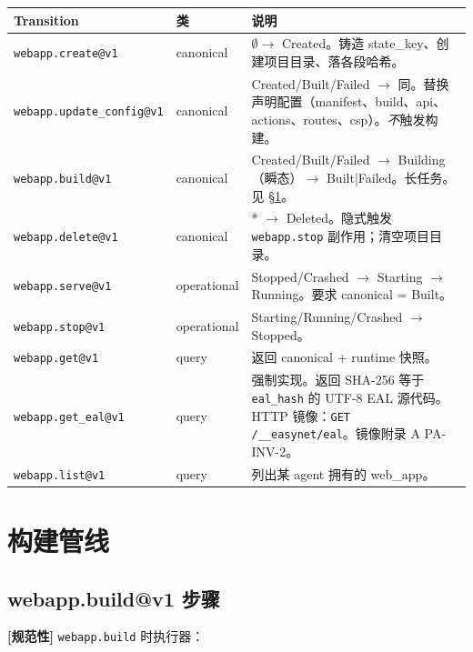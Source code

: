 \documentclass[11pt,a4paper]{article}
\newcommand{\normsv}{\textcolor{normativecolor}{\textbf{[规范性]}}\xspace}
\theoremstyle{definition}
\begin{document}
\begin{center}
\renewcommand{\arraystretch}{1.2}
\begin{tabularx}{\linewidth}{l l X}
\toprule
\textbf{Transition} & \textbf{类} & \textbf{说明} \\
\midrule
\texttt{webapp.create@v1}      & canonical   & $\emptyset \to$ Created。铸造 state\_key、创建项目目录、落各段哈希。 \\
\texttt{webapp.update\_config@v1}
                               & canonical   & Created/Built/Failed $\to$ 同。替换声明配置（manifest、build、api、actions、routes、csp）。\emph{不}触发构建。 \\
\texttt{webapp.build@v1}       & canonical   & Created/Built/Failed $\to$ Building（瞬态）$\to$ Built|Failed。长任务。见 \S\ref{sec:build-pipeline}。 \\
\texttt{webapp.delete@v1}      & canonical   & * $\to$ Deleted。隐式触发 \texttt{webapp.stop} 副作用；清空项目目录。 \\
\texttt{webapp.serve@v1}       & operational & Stopped/Crashed $\to$ Starting $\to$ Running。要求 canonical = Built。 \\
\texttt{webapp.stop@v1}        & operational & Starting/Running/Crashed $\to$ Stopped。 \\
\texttt{webapp.get@v1}         & query       & 返回 canonical + runtime 快照。 \\
\texttt{webapp.get\_eal@v1}    & query       & 强制实现。返回 SHA-256 等于 \texttt{eal\_hash} 的 UTF-8 EAL 源代码。HTTP 镜像：\texttt{GET /\_\_easynet/eal}。镜像附录 A PA-INV-2。 \\
\texttt{webapp.list@v1}        & query       & 列出某 agent 拥有的 web\_app。 \\
\bottomrule
\end{tabularx}
\end{center}

\section{构建管线}
\label{sec:build-pipeline}

\subsection{webapp.build@v1 步骤}

\normsv{} \texttt{webapp.build} 时执行器：
\end{document}
